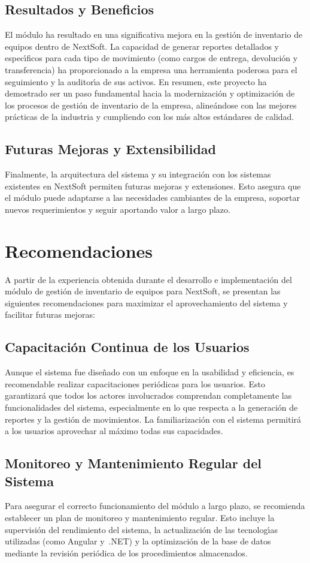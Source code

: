 \documentclass[stu, 12pt, letterpaper, donotrepeattitle, floatsintext, natbib]{apa7}
\begin{document}
\subsection{Resultados y Beneficios}
El m\'odulo ha resultado en una significativa mejora en la gesti\'on de inventario de equipos dentro de NextSoft. La capacidad de generar reportes detallados y espec\'{\i}ficos para cada tipo de movimiento (como cargos de entrega, devoluci\'on y transferencia) ha proporcionado a la empresa una herramienta poderosa para el seguimiento y la auditor\'{\i}a de sus activos. En resumen, este proyecto ha demostrado ser un paso fundamental hacia la modernizaci\'on y optimizaci\'on de los procesos de gesti\'on de inventario de la empresa, aline\'andose con las mejores pr\'acticas de la industria y cumpliendo con los m\'as altos est\'andares de calidad.
\subsection{Futuras Mejoras y Extensibilidad}
Finalmente, la arquitectura del sistema y su integraci\'on con los sistemas existentes en NextSoft permiten futuras mejoras y extensiones. Esto asegura que el m\'odulo puede adaptarse a las necesidades cambiantes de la empresa, soportar nuevos requerimientos y seguir aportando valor a largo plazo.
\newpage
\section{Recomendaciones}
A partir de la experiencia obtenida durante el desarrollo e implementaci\'on del m\'odulo de gesti\'on de inventario de equipos para NextSoft, se presentan las siguientes recomendaciones para maximizar el aprovechamiento del sistema y facilitar futuras mejoras:
\subsection{Capacitaci\'on Continua de los Usuarios}
Aunque el sistema fue dise\~{n}ado con un enfoque en la usabilidad y eficiencia, es recomendable realizar capacitaciones peri\'odicas para los usuarios. Esto garantizar\'a que todos los actores involucrados comprendan completamente las funcionalidades del sistema, especialmente en lo que respecta a la generaci\'on de reportes y la gesti\'on de movimientos. La familiarizaci\'on con el sistema permitir\'a a los usuarios aprovechar al m\'aximo todas sus capacidades.
\subsection{Monitoreo y Mantenimiento Regular del Sistema}
Para asegurar el correcto funcionamiento del m\'odulo a largo plazo, se recomienda establecer un plan de monitoreo y mantenimiento regular. Esto incluye la supervisi\'on del rendimiento del sistema, la actualizaci\'on de las tecnolog\'{\i}as utilizadas (como Angular y~.NET) y la optimizaci\'on de la base de datos mediante la revisi\'on peri\'odica de los procedimientos almacenados.
\end{document}
